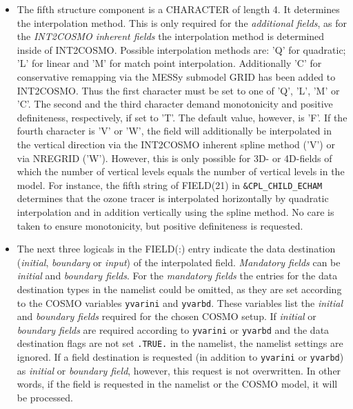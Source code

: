 \documentclass[11pt,twoside]{article}
\begin{document}
\begin{itemize}
\item The fifth structure component is a {\footnotesize CHARACTER} of length 4.
 It determines the interpolation method. This is only required for the 
{\it additional fields}, as for the {\it INT2COSMO inherent fields} the 
interpolation method is determined inside of INT2COSMO. Possible interpolation
methods are: 'Q'  for quadratic;  'L' for linear and 'M' for match point
interpolation. Additionally 'C' for conservative remapping via the MESSy
submodel GRID has been added to INT2COSMO.
Thus the first character must be set to one of 'Q', 'L', 'M' or 'C'.  The
second and the third character demand monotonicity and positive definiteness, respectively,
 if set to ’T’. The default value, however, is ’F’. If the fourth character is 
 'V' or 'W', the field will additionally be interpolated in the vertical
 direction via 
 the INT2COSMO inherent spline method ('V') or via NREGRID ('W'). However, 
 this is only possible for 3D- or 4D-fields of which the number of vertical 
 levels equals the number of vertical levels in the model. For instance, the 
 fifth string of FIELD(21) in \verb|&CPL_CHILD_ECHAM| determines that the ozone 
 tracer is interpolated horizontally by quadratic interpolation and in addition
  vertically using the spline method. No care is taken to ensure monotonicity,
  but positive  definiteness is requested. 
\item The next three logicals in the FIELD(:) entry indicate the data
destination  ({\it initial},  
{\it boundary} or {\it input}) of the interpolated field.
{\it Mandatory fields} can be {\it initial} and {\it boundary fields}.
 For the {\it mandatory fields} the entries for the data destination types in 
the namelist could be omitted, as they are set according to the COSMO variables 
\verb|yvarini| and \verb|yvarbd|. These variables list the {\it initial} and 
{\it boundary fields} required for the chosen COSMO setup. 
If {\it initial} or {\it boundary fields} are required according to 
\verb|yvarini| or \verb|yvarbd| and the data destination flags are not set 
\verb|.TRUE.| in the namelist, the namelist settings are ignored.
If a field destination is requested (in addition to \verb|yvarini| or 
\verb|yvarbd|) as {\it initial} or {\it boundary field}, however, this request
 is not overwritten. In other words, if the field is requested
 in the namelist or the COSMO model, it will be processed.
 

\end{itemize}
\end{document}
